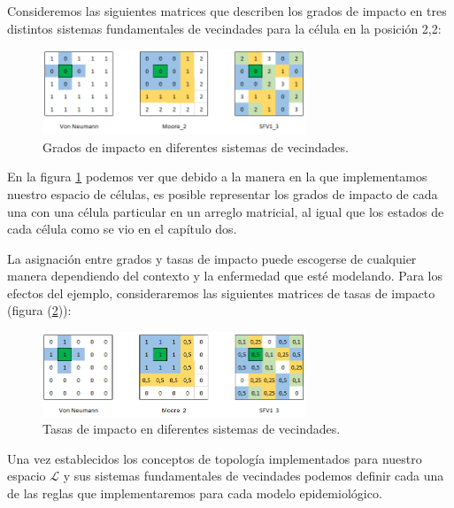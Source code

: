 \begin{example}
Consideremos las siguientes matrices que describen los grados de impacto en tres distintos sistemas fundamentales de vecindades para la célula en la posición 2,2:

\begin{figure}[h]
  \centering
    \includegraphics[width=0.7\textwidth]{Imagenes/ex315.PNG}
  \caption{Grados de impacto en diferentes sistemas de vecindades.}
  \label{fig:gradoImpacto}
\end{figure}

En la figura \ref{fig:gradoImpacto} podemos ver que debido a la manera en la que implementamos nuestro espacio de células, es posible representar los grados de impacto de cada una con una célula particular en un arreglo matricial, al igual que los estados de cada célula como se vio en el capítulo dos.

\newpage

La asignación entre grados y tasas de impacto puede escogerse de cualquier manera dependiendo del contexto y la enfermedad que esté modelando. Para los efectos del ejemplo, consideraremos las siguientes matrices de tasas de impacto (figura (\ref{fig:tasaImpacto})):

\begin{figure}[h]
  \centering
    \includegraphics[width=0.7\textwidth]{Imagenes/ex3152.PNG}
  \caption{Tasas de impacto en diferentes sistemas de vecindades.}
  \label{fig:tasaImpacto}
\end{figure}
\end{example}

Una vez establecidos los conceptos de topología implementados para nuestro espacio $\mathcal{L}$ y sus sistemas fundamentales de vecindades podemos definir cada una de las reglas que implementaremos para cada modelo epidemiológico.

